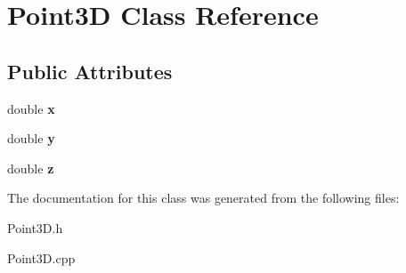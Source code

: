 \hypertarget{classPoint3D}{\section{Point3\-D Class Reference}
\label{classPoint3D}
}
\subsection*{Public Attributes}
\begin{DoxyCompactItemize}
\item 
\hypertarget{classPoint3D_abf9d1f564d599503cdb114934c7044b7}{double {\bfseries x}}\label{classPoint3D_abf9d1f564d599503cdb114934c7044b7}

\item 
\hypertarget{classPoint3D_abcb44b06e310b076fa9d65dec8541dd4}{double {\bfseries y}}\label{classPoint3D_abcb44b06e310b076fa9d65dec8541dd4}

\item 
\hypertarget{classPoint3D_a9f4a32e3afccb3c9fe9b5cd88e179c3d}{double {\bfseries z}}\label{classPoint3D_a9f4a32e3afccb3c9fe9b5cd88e179c3d}

\end{DoxyCompactItemize}


The documentation for this class was generated from the following files\-:\begin{DoxyCompactItemize}
\item 
Point3\-D.\-h\item 
Point3\-D.\-cpp\end{DoxyCompactItemize}
